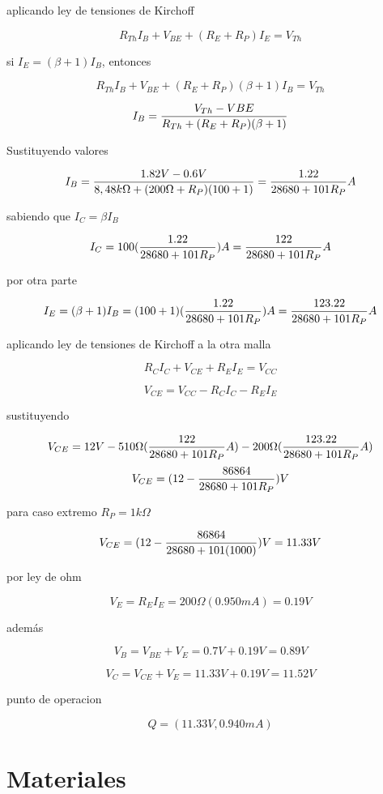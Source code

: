 \documentclass[10pt, a4paper]{article}
\begin{document}
    aplicando ley de tensiones de Kirchoff

    $$R_{Th}I_B + V_{BE} + (R_E + R_P)I_E = V_{Th}$$

    si $I_E = (\beta + 1)I_B$, entonces

    $$R_{Th}I_B + V_{BE} + (R_E + R_P)(\beta + 1)I_B = V_{Th}$$

    $$I_B = {V_{Th} - V{BE} \over R_{Th} + (R_E + R_P)(\beta + 1)}$$

    Sustituyendo valores

    $$I_B = {1.82V - 0.6V \over 8,48k\Omega + (200\Omega + R_P)(100 + 1)} = {1.22 \over 28680 +101R_P} A$$

    sabiendo que $I_C = \beta I_B$

    $$I_C = 100({1.22 \over 28680 +101R_P})A = {122 \over 28680 +101R_P}A$$

    por otra parte

    $$I_E = (\beta + 1)I_B = (100 + 1)({1.22 \over 28680 +101R_P})A = {123.22 \over 28680 +101R_P}A$$

    aplicando ley de tensiones de Kirchoff a la otra malla

    $$R_{C}I_C + V_{CE} + R_EI_E = V_{CC}$$

    $$V_{CE} = V_{CC} - R_{C}I_C - R_EI_E$$

    sustituyendo

    $$V_{CE} = 12V - 510\Omega ({122 \over 28680 +101R_P}A) - 200\Omega ({123.22 \over 28680 +101R_P}A)$$
    $$V_{CE} = (12 - {86864 \over 28680 +101R_P})V$$

    para caso extremo $R_P = 1k\Omega$

    $$V_{CE} = (12 - {86864 \over 28680 +101(1000)})V = 11.33V$$

    por ley de ohm

    $$V_E = R_EI_E = 200\Omega (0.950mA) = 0.19V$$

    además

    $$V_B = V_{BE} + V_E = 0.7V + 0.19V = 0.89V$$

    $$V_C = V_{CE} + V_E = 11.33V + 0.19V = 11.52V$$

    punto de operacion

    $$Q = (11.33V, 0.940mA)$$

    \newpage

    \section{Materiales}
\end{document}
